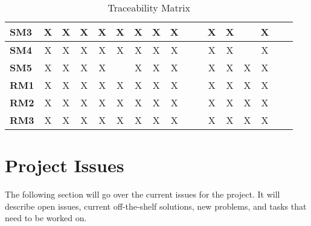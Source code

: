 \documentclass[12pt]{article}
\begin{document}
\begin{table}[H]
\begin{adjustwidth}{-0.1in}{-1in}
{\begin{tabular}{c|c|c|c|c|c|c|c|c|c|c|c|c|c|c|c|c|}
\multicolumn{1}{|l|}{\textbf{SM3}}   &      X       &       X      &       X      &       X      &       X      &       X      &       X      &       X      &              &              &       X      &       X      &              &       X      &             &              \\ \hline
\multicolumn{1}{|l|}{\textbf{SM4}}   &      X       &       X      &       X      &       X      &       X      &       X      &       X      &       X      &              &              &       X      &       X      &              &       X      &             &              \\ \hline
\multicolumn{1}{|l|}{\textbf{SM5}}   &      X       &       X      &       X      &       X      &              &       X      &       X      &       X      &              &              &       X      &       X      &       X      &       X      &             &              \\ \hline
\multicolumn{1}{|l|}{\textbf{RM1}}   &      X       &       X      &       X      &       X      &       X      &       X      &       X      &       X      &              &              &       X      &       X      &       X      &       X      &             &              \\ \hline
\multicolumn{1}{|l|}{\textbf{RM2}}   &      X       &       X      &       X      &       X      &       X      &       X      &       X      &       X      &              &              &       X      &       X      &       X      &       X      &             &              \\ \hline
\multicolumn{1}{|l|}{\textbf{RM3}}   &      X       &       X      &       X      &       X      &       X      &       X      &       X      &       X      &              &              &       X      &       X      &       X      &       X      &             &              \\ \hline
\end{tabular}

}
\caption{Traceability Matrix}
    \label{tab:matrix2}
\end{adjustwidth}
\end{table}





\section{Project Issues}
The following section will go over the current issues for the project. It will describe open issues, current off-the-shelf solutions, new problems, and tasks that need to be worked on.
\end{document}
